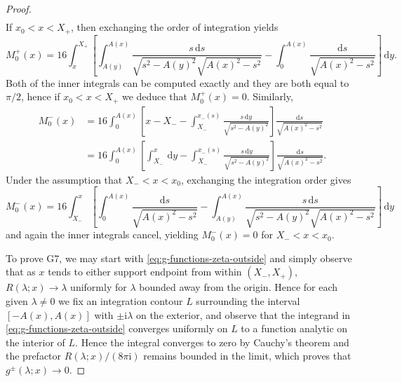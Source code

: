 \documentclass[12pt]{amsart}
\numberwithin{equation}{section}
\newcommand{\dd}{\mathrm{d}}
\newcommand{\ii}{\mathrm{i}}
\newcommand{\SP}{\lambda}
\begin{document}
\begin{proof}
\begin{equation}
\begin{split}
\end{split}
\end{equation}
If $x_0<x<X_+$, then exchanging the order of integration yields
\begin{equation}
M_0^+(x)=16\int_x^{X_+}\left[\int_{A(y)}^{A(x)}\frac{s\,\dd s}{\sqrt{s^2-A(y)^2}\sqrt{A(x)^2-s^2}}
-\int_0^{A(x)}\frac{\dd s}{\sqrt{A(x)^2-s^2}}\right]\,\dd y.
\end{equation}
Both of the inner integrals can be computed exactly and they are both equal to $\pi/2$, hence if $x_0<x<X_+$ we deduce that $M_0^+(x)=0$.
Similarly,
\begin{equation}
\begin{split}
M_0^-(x)&=16\int_0^{A(x)}\left[x-X_--\int_{X_-}^{x_-(s)}\frac{s\,\dd y}{\sqrt{s^2-A(y)^2}}\right]\frac{\dd s}{\sqrt{A(x)^2-s^2}}\\
&= 16\int_0^{A(x)}\left[\int_{X_-}^x\,\dd y-\int_{X_-}^{x_-(s)}\frac{s\,\dd y}{\sqrt{s^2-A(y)^2}}\right]\frac{\dd s}{\sqrt{A(x)^2-s^2}}.
\end{split}
\end{equation}
Under the assumption that $X_-<x<x_0$, exchanging the integration order gives
\begin{equation}
M_0^-(x)=16\int_{X_-}^x\left[\int_0^{A(x)}\frac{\dd s}{\sqrt{A(x)^2-s^2}}-\int_{A(y)}^{A(x)}\frac{s\,\dd s}{\sqrt{s^2-A(y)^2}\sqrt{A(x)^2-s^2}}\right]\,\dd y
\end{equation}
and again the inner integrals cancel, yielding $M_0^-(x)=0$ for $X_-<x<x_0$.

To prove G7, we may start with \eqref{eq:g-functions-zeta-outside} and simply observe that as $x$ tends to either support endpoint from within $(X_-,X_+)$, $R(\SP;x)\to \SP$ uniformly for $\SP$ bounded away from the origin.  Hence for each given $\SP\neq 0$ we fix an integration contour $L$ surrounding the interval $[-A(x),A(x)]$ with $\pm \ii\SP$ on the exterior, and observe that the integrand in \eqref{eq:g-functions-zeta-outside} converges uniformly on $L$ to a function analytic on the interior of $L$.  Hence the integral converges to zero by Cauchy's theorem and the prefactor $R(\SP;x)/(8\pi \ii)$ remains bounded in the limit, which proves that $g^\pm(\SP;x)\to 0$.


\end{proof}
\end{document}
